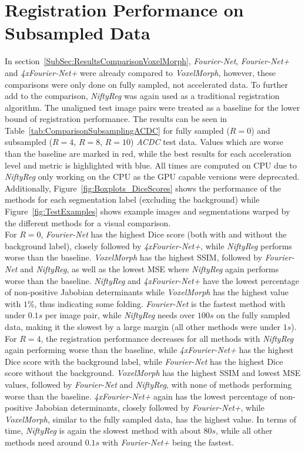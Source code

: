 \section{Registration Performance on Subsampled Data} \label{SubSec:ResultsComparisonSubsampling}
In section~\ref{SubSec:ResultsComparisonVoxelMorph}, \emph{Fourier-Net}, \emph{Fourier-Net+} and \emph{4xFourier-Net+} were already compared to \emph{VoxelMorph}, however, these comparisons were only done on fully sampled, not accelerated data. To further add to the comparison, \emph{NiftyReg} was again used as a traditional registration algorithm. The unaligned test image pairs were treated as a baseline for the lower bound of registration performance. The results can be seen in Table~\ref{tab:ComparisonSubsamplingACDC} for fully sampled ($R=0$) and subsampled ($R=4$, $R=8$, $R=10$) \emph{ACDC} test data. Values which are worse than the baseline are marked in red, while the best results for each acceleration level and metric is highlighted with blue. All times are computed on CPU due to \emph{NiftyReg} only working on the CPU as the GPU capable versions were deprecated. Additionally, Figure~\ref{fig:Boxplots_DiceScores} shows the performance of the methods for each segmentation label (excluding the background) while Figure~\ref{fig:TestExamples} shows example images and segmentations warped by the different methods for a visual comparison.\\
For $R=0$, \emph{Fourier-Net} has the highest Dice score (both with and without the background label), closely followed by \emph{4xFourier-Net+}, while \emph{NiftyReg} performs worse than the baseline. \emph{VoxelMorph} has the highest SSIM, followed by \emph{Fourier-Net} and \emph{NiftyReg}, as well as the lowest MSE where \emph{NiftyReg} again performs worse than the baseline. \emph{NiftyReg} and \emph{4xFourier-Net+} have the lowest percentage of non-positive Jabobian determinants while \emph{VoxelMorph} has the highest value with $1\%$, thus indicating some folding. \emph{Fourier-Net} is the fastest method with under $0.1s$ per image pair, while \emph{NiftyReg} needs over $100s$ on the fully sampled data, making it the slowest by a large margin (all other methods were under $1s$).\\
For $R=4$, the registration performance decreases for all methods with \emph{NiftyReg} again performing worse than the baseline, while \emph{4xFourier-Net+} has the highest Dice score with the background label, while \emph{Fourier-Net} has the highest Dice score without the background. \emph{VoxelMorph} has the highest SSIM and lowest MSE values, followed by \emph{Fourier-Net} and \emph{NiftyReg}, with none of methods performing worse than the baseline. \emph{4xFourier-Net+} again has the lowest percentage of non-positive Jabobian determinants, closely followed by \emph{Fourier-Net+}, while \emph{VoxelMorph}, similar to the fully sampled data, has the highest value. In terms of time, \emph{NiftyReg} is again the slowest method with about $80s$, while all other methods need around $0.1s$ with \emph{Fourier-Net+} being the fastest.\\
